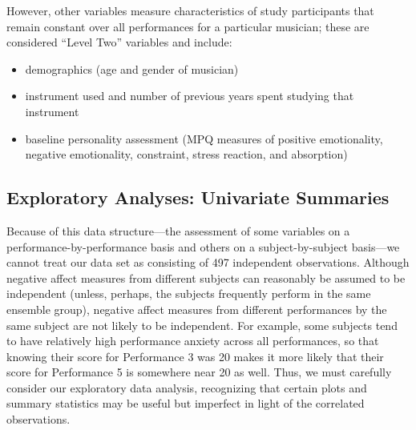 \documentclass[
]{krantz}
\providecommand{\tightlist}{%
  \setlength{\itemsep}{0pt}\setlength{\parskip}{0pt}}
\begin{document}
However, other variables measure characteristics of study participants that remain constant over all performances for a particular musician; these are considered ``Level Two'' variables and include:

\begin{itemize}
\tightlist
\item
  demographics (age and gender of musician)
\item
  instrument used and number of previous years spent studying that instrument
\item
  baseline personality assessment (MPQ measures of positive emotionality, negative emotionality, constraint, stress reaction, and absorption)
\end{itemize}

\hypertarget{explore1}{%
\subsection{Exploratory Analyses: Univariate Summaries}\label{explore1}}

Because of this data structure---the assessment of some variables on a performance-by-performance basis and others on a subject-by-subject basis---we cannot treat our data set as consisting of 497 independent observations. Although negative affect measures from different subjects can reasonably be assumed to be independent (unless, perhaps, the subjects frequently perform in the same ensemble group), negative affect measures from different performances by the same subject are not likely to be independent. For example, some subjects tend to have relatively high performance anxiety across all performances, so that knowing their score for Performance 3 was 20 makes it more likely that their score for Performance 5 is somewhere near 20 as well. Thus, we must carefully consider our exploratory data analysis, recognizing that certain plots and summary statistics may be useful but imperfect in light of the correlated observations.
\end{document}
